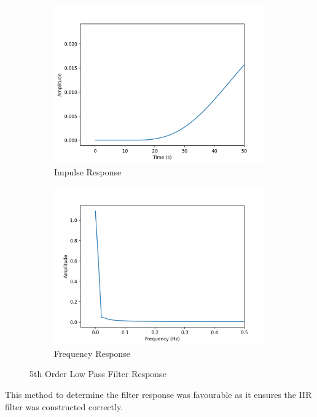 \documentclass{article}
\begin{document}
\begin{figure}[H]
\centering
\begin{subfigure}{.5\textwidth}
  \centering
  \includegraphics[scale=0.4]{iResponse}
  \caption{Impulse Response}
  \label{fig:a}
\end{subfigure}%
\begin{subfigure}{.5\textwidth}
  \centering
  \includegraphics[scale=0.4]{fResponse}
  \caption{Frequency Response}
  \label{fig:b}
\end{subfigure}
\caption{5th Order Low Pass Filter Response}
\label{fig:reponse}
\end{figure}
This method to determine the filter response was favourable as it ensures the IIR filter was constructed correctly.
\end{document}

